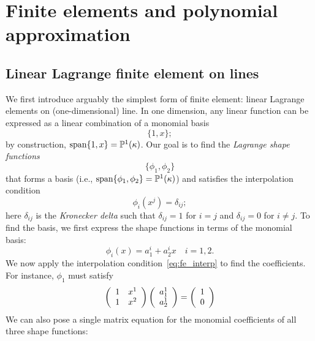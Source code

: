 \chapter{Finite elements and polynomial approximation}

\disclaimer

\section{Linear Lagrange finite element on lines}
\label{sec:fe_lin_line}
We first introduce arguably the simplest form of finite element: linear Lagrange elements on (one-dimensional) line. In one dimension, any linear function can be expressed as a linear combination of a monomial basis
\begin{equation*}
  \{ 1, x \};
\end{equation*}
by construction, $\text{span}\{1,x\} = \PP^1(\kappa)$. Our goal is to find the \emph{Lagrange shape functions}
\begin{equation*}
  \{ \phi_1, \phi_2 \}
\end{equation*}
that forms a basis (i.e., $\text{span}\{ \phi_1, \phi_2 \} = \PP^1(\kappa)$) and satisfies the interpolation condition
\begin{equation}
  \phi_i(x^j) = \delta_{ij};  \label{eq:fe_interp}
\end{equation}
here $\delta_{ij}$ is the \emph{Kronecker delta} such that $\delta_{ij} = 1$ for $i = j$ and $\delta_{ij} = 0$ for $i \neq j$.  To find the basis, we first express the shape functions in terms of the monomial basis:
\begin{equation}
  \phi_i(x) = a^i_1 + a^i_2 x \quad i = 1, 2.
  \label{eq:fe_lin_line_rep}
\end{equation}
We now apply the interpolation condition~\eqref{eq:fe_interp} to find the coefficients.  For instance, $\phi_1$ must satisfy
\begin{equation*}
  \bmat{cc}
  1 & x^1 \\
  1 & x^2 \\
  \emat
  \bmat{c}
  a_1^1 \\ a_2^1 
  \emat
  =
  \bmat{c}
  1 \\ 0 
  \emat
\end{equation*}
We can also pose a single matrix equation for the monomial coefficients of all three shape functions: 
